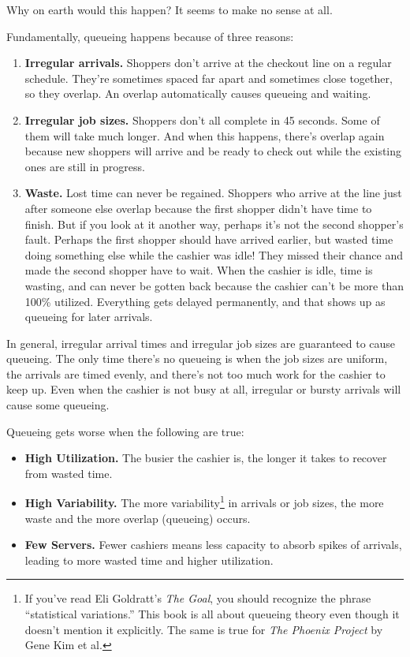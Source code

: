 \documentclass{vivid_layout_pdf}
\begin{document}
Why on earth would this happen? It seems to make no sense at all.

Fundamentally, queueing happens because of three reasons:
\begin{enumerate}	%
\item {\bfseries Irregular arrivals.} Shoppers don't arrive at the checkout line on a regular schedule. They're sometimes spaced far apart and sometimes
close together, so they overlap. An overlap automatically causes
queueing and waiting.
\item {\bfseries Irregular job sizes.} Shoppers don't all complete in 45 seconds.
Some of them will take much longer. And when this happens, there's
overlap again because new shoppers will arrive and be ready to
check out while the existing ones are still in progress.
\item {\bfseries Waste.} Lost time can never be regained. Shoppers who arrive at the line just after someone else overlap because the first shopper didn't have time to finish. But if you look at it another way, perhaps it's not the second shopper's fault. Perhaps the first shopper should have arrived earlier, but wasted time doing something else while the cashier was idle! They missed their chance and made the second shopper have to wait. When the cashier is idle, time is wasting, and can never be gotten back because the cashier can't be more than 100\% utilized. Everything gets delayed permanently, and that shows up as queueing for later arrivals.
\end{enumerate}
In general, irregular arrival times and irregular job sizes are guaranteed to cause queueing.  The only time there's no queueing is when the job sizes are uniform, the arrivals are timed evenly, and there's not too much work for the cashier to keep up. Even when the cashier is not busy at all, irregular or bursty arrivals will cause some queueing.

Queueing gets worse when the following are true:

\begin{itemize}
\item {\bfseries High Utilization.} The busier the cashier is, the longer it takes to recover from wasted time.
\item {\bfseries High Variability.} The more variability\footnote{If you've read Eli Goldratt's {\itshape The Goal}, you should recognize the phrase ``statistical variations.'' This book is all about queueing theory even though it doesn't mention it explicitly. The same is true for {\itshape The Phoenix Project} by Gene Kim et al.} in arrivals or job sizes, the more waste and the more overlap (queueing) occurs.
\item {\bfseries Few Servers.} Fewer cashiers means less capacity to absorb spikes of arrivals, leading to more wasted time and higher utilization.
\end{itemize}
\end{document}
